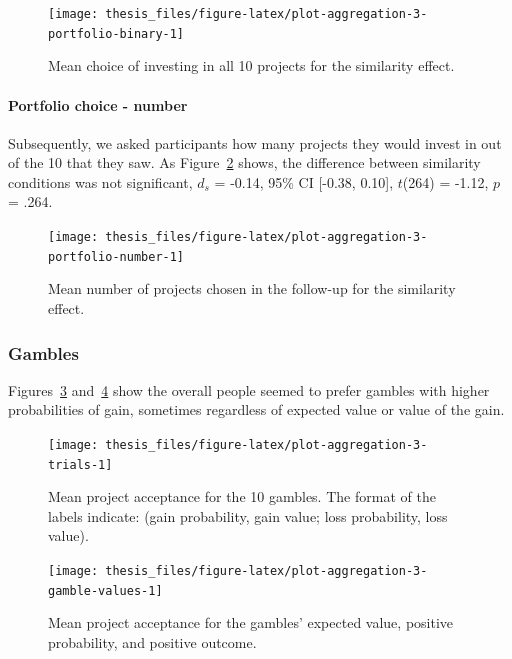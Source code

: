 \documentclass[a4paper, nobind, dvipsnames]{templates/ociamthesis}
\theoremstyle{definition}
\theoremstyle{definition}
\theoremstyle{definition}
\theoremstyle{definition}
\theoremstyle{remark}
\begin{document}
\begin{figure}
\texttt{[image: thesis\_files/figure-latex/plot-aggregation-3-portfolio-binary-1]} \caption{Mean choice of investing in all 10 projects for the similarity effect.}\label{fig:plot-aggregation-3-portfolio-binary}
\end{figure}

\hypertarget{portfolio-choice---number-1}{%
\paragraph{Portfolio choice - number}\label{portfolio-choice---number-1}}

Subsequently, we asked participants how many projects they would invest in out
of the 10 that they saw. As
Figure~\ref{fig:plot-aggregation-3-portfolio-number} shows, the difference
between similarity conditions was not significant,
\(d_s\) = -0.14, 95\% CI {[}-0.38, 0.10{]}, \(t\)(264) = -1.12, \(p\) = .264.



\begin{figure}
\texttt{[image: thesis\_files/figure-latex/plot-aggregation-3-portfolio-number-1]} \caption{Mean number of projects chosen in the follow-up for the similarity effect.}\label{fig:plot-aggregation-3-portfolio-number}
\end{figure}

\hypertarget{gambles-1}{%
\subsubsection{Gambles}\label{gambles-1}}

Figures~\ref{fig:plot-aggregation-3-trials}
and~\ref{fig:plot-aggregation-3-gamble-values} show the
overall people seemed to prefer gambles with higher probabilities of gain,
sometimes regardless of expected value or value of the gain.



\begin{figure}
\texttt{[image: thesis\_files/figure-latex/plot-aggregation-3-trials-1]} \caption{Mean project acceptance for the 10 gambles. The format of the labels indicate: (gain probability, gain value; loss probability, loss value).}\label{fig:plot-aggregation-3-trials}
\end{figure}




\begin{figure}
\texttt{[image: thesis\_files/figure-latex/plot-aggregation-3-gamble-values-1]} \caption{Mean project acceptance for the gambles'
expected value, positive probability, and positive outcome.}\label{fig:plot-aggregation-3-gamble-values}
\end{figure}
\end{document}
